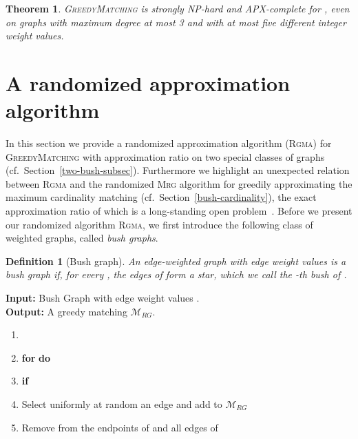 \documentclass[a4paper,11pt]{article}
\newtheorem{theorem}{Theorem}
\newtheorem{definition}{Definition}
\newcommand{\mrgma}{\ensuremath{\mathcal{M}_{RG}}\xspace}
\newcommand{\greedy}{\textsc{GreedyMatching}\xspace}
\newcommand{\rgma}{\textsc{Rgma}\xspace}
\newcommand{\mrg}{\textsc{Mrg}\xspace}
\begin{document}
\begin{theorem}
\label{thm-maximum-component-parameter} 
\greedy is \emph{strongly NP-hard} and \emph{APX-complete} for ,
even on graphs with maximum degree at most 3 and with at most five different 
integer weight values.
\end{theorem}




\section{A randomized approximation algorithm\label{sec:approx}} 

In this section we provide a randomized approximation algorithm (\rgma) for \greedy with approximation ratio  on two special classes of graphs (cf.~Section~\ref{two-bush-subsec}). 
Furthermore we highlight an unexpected relation between \rgma and the randomized \mrg algorithm for greedily approximating the maximum cardinality matching (cf.~Section~\ref{bush-cardinality}), 
the exact approximation ratio of which is a long-standing open problem~\cite{PS12,ADFS95,DF91}. 
Before we present our randomized algorithm \rgma, we first introduce the following class of weighted graphs, called \emph{bush graphs}.



\begin{definition}[Bush graph]
\label{def:bushg}
An \emph{edge-weighted} graph  with  edge weight values  
is a \emph{bush graph} if, for every , the edges of  form a \emph{star}, 
which we call the \emph{-th bush} of .
\end{definition}




\begin{tcolorbox}[title=\rgma]
\textbf{Input:} Bush Graph  with edge weight values .\\
\textbf{Output:} A greedy matching \mrgma.\vspace{-2mm}
\begin{enumerate}
\item 
\vspace{-2mm}
\item \textbf{for}  \textbf{do}
\vspace{-2mm}
\item \hspace*{2mm} \textbf{if} 
\vspace{-2mm}
\item \hspace*{5mm} Select uniformly at random an edge  and add  to \mrgma
\vspace{-2mm}
\item \hspace*{5mm} Remove from  the endpoints of  and all edges of 
\end{enumerate}
\end{tcolorbox}
\end{document}
